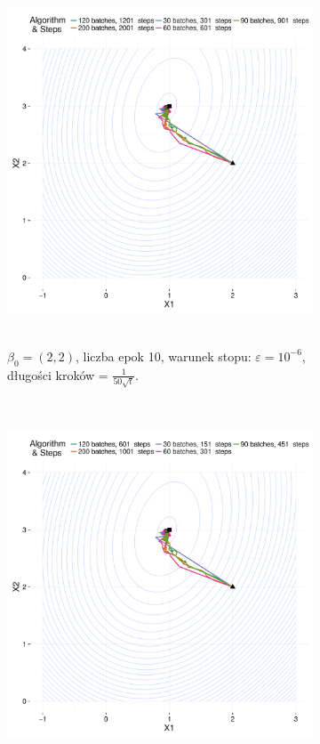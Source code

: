 \begin{figure}[hbt!]
  \begin{center}
   \begin{subfigure}[h!]{0.9\textwidth}
      \includegraphics[width=\textwidth, height=310pt]{Obrazki/b_2_2_iter_10_e-6_50sqrt.pdf}
      \caption{$\beta_0=(2,2)$, liczba epok 10, warunek stopu: $\varepsilon=10^{-6}$, długości kroków = $\frac{1}{50\sqrt{t}}$.}
   \end{subfigure}     
   \begin{subfigure}[h!]{0.9\textwidth}
      \includegraphics[width=\textwidth, height=310pt]{Obrazki/b_2_2_iter_5_e-5_50sqrt.pdf}

\end{subfigure}
\end{center}
\end{figure}
